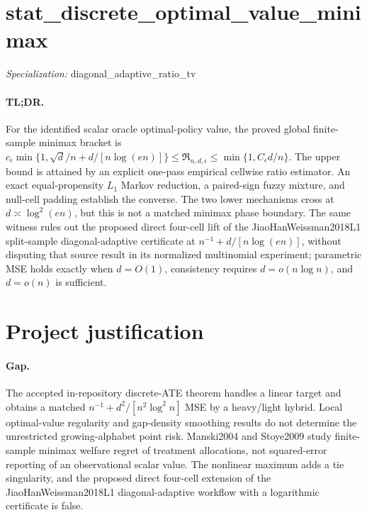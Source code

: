 \documentclass{article}
\begin{document}
\sloppy

\section*{stat\_\allowbreak{}discrete\_\allowbreak{}optimal\_\allowbreak{}value\_\allowbreak{}minimax}

\noindent\textit{Specialization:} diagonal\_\allowbreak{}adaptive\_\allowbreak{}ratio\_\allowbreak{}tv\par

\paragraph{TL;DR.} For the identified scalar oracle optimal-policy value, the proved global finite-sample minimax bracket is \(c_\epsilon\min\{1,\sqrt d/n+d/[n\log(en)]\}\leq\mathfrak R_{n,d,\epsilon}\leq\min\{1,C_\epsilon d/n\}\). The upper bound is attained by an explicit one-pass empirical cellwise ratio estimator. An exact equal-propensity \(L_1\) Markov reduction, a paired-sign fuzzy mixture, and null-cell padding establish the converse. The two lower mechanisms cross at \(d\asymp\log^2(en)\), but this is not a matched minimax phase boundary. The same witness rules out the proposed direct four-cell lift of the JiaoHanWeissman2018L1 split-sample diagonal-adaptive certificate at \(n^{-1}+d/[n\log(en)]\), without disputing that source result in its normalized multinomial experiment; parametric MSE holds exactly when \(d=O(1)\), consistency requires \(d=o(n\log n)\), and \(d=o(n)\) is sufficient.

\section{Project justification}

\paragraph{Gap.} The accepted in-repository discrete-ATE theorem handles a linear target and obtains a matched \(n^{-1}+d^2/[n^2\log^2 n]\) MSE by a heavy/light hybrid. Local optimal-value regularity and gap-density smoothing results do not determine the unrestricted growing-alphabet point risk. Manski2004 and Stoye2009 study finite-sample minimax welfare regret of treatment allocations, not squared-error reporting of an observational scalar value. The nonlinear maximum adds a tie singularity, and the proposed direct four-cell extension of the JiaoHanWeissman2018L1 diagonal-adaptive workflow with a logarithmic certificate is false.
\end{document}
